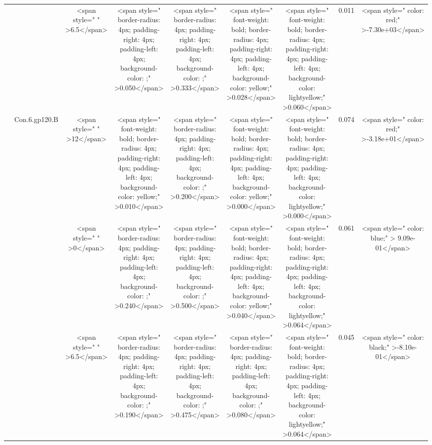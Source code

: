 \begin{tabular}{c|c|c|c|c|c|c|c|c}
\cline{1-9}
 &  & <span style="     " >6.5</span> & <span style="     border-radius: 4px; padding-right: 4px; padding-left: 4px; background-color: ;" >0.050</span> & <span style="     border-radius: 4px; padding-right: 4px; padding-left: 4px; background-color: ;" >0.333</span> & <span style=" font-weight: bold;    border-radius: 4px; padding-right: 4px; padding-left: 4px; background-color: yellow;" >0.028</span> & <span style=" font-weight: bold;    border-radius: 4px; padding-right: 4px; padding-left: 4px; background-color: lightyellow;" >0.060</span> & 0.011 & <span style="     color: red;" >-7.30e+03</span>\\
\cline{3-9}
 & \multirow{-2}{*}{\centering\arraybackslash Con.6.gp120.B} & <span style="     " >12</span> & <span style=" font-weight: bold;    border-radius: 4px; padding-right: 4px; padding-left: 4px; background-color: yellow;" >0.010</span> & <span style="     border-radius: 4px; padding-right: 4px; padding-left: 4px; background-color: ;" >0.200</span> & <span style=" font-weight: bold;    border-radius: 4px; padding-right: 4px; padding-left: 4px; background-color: yellow;" >0.000</span> & <span style=" font-weight: bold;    border-radius: 4px; padding-right: 4px; padding-left: 4px; background-color: lightyellow;" >0.000</span> & 0.074 & <span style="     color: red;" >-3.18e+01</span>\\
\cline{2-9}
 &  & <span style="     " >0</span> & <span style="     border-radius: 4px; padding-right: 4px; padding-left: 4px; background-color: ;" >0.240</span> & <span style="     border-radius: 4px; padding-right: 4px; padding-left: 4px; background-color: ;" >0.500</span> & <span style=" font-weight: bold;    border-radius: 4px; padding-right: 4px; padding-left: 4px; background-color: yellow;" >0.040</span> & <span style=" font-weight: bold;    border-radius: 4px; padding-right: 4px; padding-left: 4px; background-color: lightyellow;" >0.064</span> & 0.061 & <span style="     color: blue;" > 9.09e-01</span>\\
\cline{3-9}
 &  & <span style="     " >6.5</span> & <span style="     border-radius: 4px; padding-right: 4px; padding-left: 4px; background-color: ;" >0.190</span> & <span style="     border-radius: 4px; padding-right: 4px; padding-left: 4px; background-color: ;" >0.475</span> & <span style="     border-radius: 4px; padding-right: 4px; padding-left: 4px; background-color: ;" >0.080</span> & <span style=" font-weight: bold;    border-radius: 4px; padding-right: 4px; padding-left: 4px; background-color: lightyellow;" >0.064</span> & 0.045 & <span style="     color: black;" >-8.10e-01</span>\\

\end{tabular}
